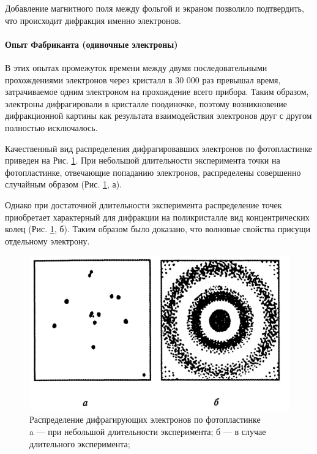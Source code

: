 Добавление магнитного поля между фольгой и экраном позволило подтвердить, что происходит дифракция именно электронов.

\paragraph{Опыт Фабриканта (одиночные электроны)}
В этих опытах промежуток времени между двумя последовательными прохождениями электронов через кристалл в 30 000 раз превышал время, затрачиваемое одним электроном на прохождение всего прибора. Таким образом, электроны дифрагировали в кристалле поодиночке, поэтому возникновение дифракционной картины как результата взаимодействия электронов друг с другом полностью исключалось.

Качественный вид распределения дифрагировавших электронов по фотопластинке приведен на Рис. \ref{fig:fabrikant-results}. При небольшой длительности эксперимента точки на фотопластинке, отвечающие попаданию электронов, распределены совершенно случайным образом (Рис. \ref{fig:fabrikant-results}, а). 

Однако при достаточной длительности эксперимента распределение точек приобретает характерный для дифракции на поликристалле вид концентрических колец (Рис. \ref{fig:fabrikant-results}, б). Таким образом было доказано, что волновые свойства присущи отдельному электрону.
\begin{figure}[H]
	\centering
	\includegraphics[width=0.45\linewidth]{img/oral-05/fabrikant-results}
	\caption{Распределение дифрагирующих электронов по фотопластинке \\ a --- при небольшой длительности эксперимента; б --- в случае длительного эксперимента;}
	\label{fig:fabrikant-results}
\end{figure}

